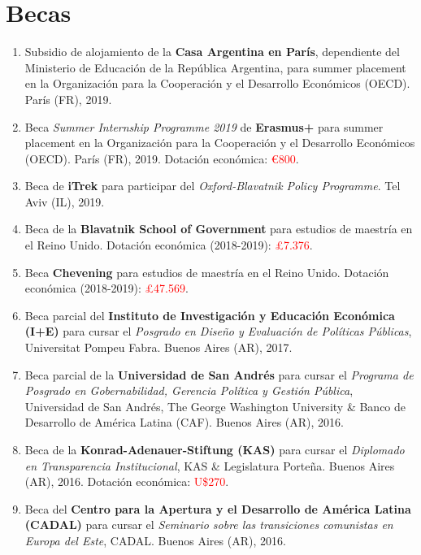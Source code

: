 \documentclass[12pt]{article}
\begin{document}
\section*{Becas}

\begin{enumerate}

\item Subsidio de alojamiento de la {\bf Casa Argentina en París}, dependiente del Ministerio de Educación de la República Argentina, para summer placement en la Organización para la Cooperación y el Desarrollo Económicos (OECD). París (FR), 2019.

\item Beca {\it Summer Internship Programme 2019} de {\bf Erasmus+} para summer placement en la Organización para la Cooperación y el Desarrollo Económicos (OECD). París (FR), 2019. Dotación económica: \textcolor{red}{€800}.

\item Beca de {\bf iTrek} para participar del {\it Oxford-Blavatnik Policy Programme}. Tel Aviv (IL), 2019.

\item Beca de la {\bf Blavatnik School of Government} para estudios de maestría en el Reino Unido. Dotación económica (2018-2019): \textcolor{red}{£7.376}.

\item Beca {\bf Chevening} para estudios de maestría en el Reino Unido. Dotación económica (2018-2019): \textcolor{red}{£47.569}.

\item Beca parcial del {\bf Instituto de Investigación y Educación Económica (I+E)} para cursar el {\it Posgrado en Diseño y Evaluación de Políticas Públicas}, Universitat Pompeu Fabra. Buenos Aires (AR), 2017.

\item Beca parcial de la {\bf Universidad de San Andrés} para cursar el {\it Programa de Posgrado en Gobernabilidad, Gerencia Política y Gestión Pública}, Universidad de San Andrés, The George Washington University \& Banco de Desarrollo de América Latina (CAF). Buenos Aires (AR), 2016.

\item Beca de la {\bf Konrad-Adenauer-Stiftung (KAS)} para cursar el {\it Diplomado en Transparencia Institucional}, KAS \& Legislatura Porteña. Buenos Aires (AR), 2016. Dotación económica: \textcolor{red}{U\$270}.

\item Beca del {\bf Centro para la Apertura y el Desarrollo de América Latina (CADAL)} para cursar el {\it Seminario sobre las transiciones comunistas en Europa del Este}, CADAL. Buenos Aires (AR), 2016.


\end{enumerate}
\end{document}
